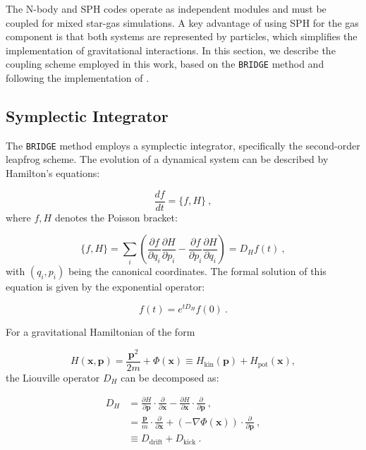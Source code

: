 The N-body and SPH codes operate as independent modules and must be coupled for mixed star-gas simulations. A key advantage of using SPH for the gas component is that both systems are represented by particles, which simplifies the implementation of gravitational interactions. In this section, we describe the coupling scheme employed in this work, based on the \texttt{BRIDGE} method \citep{fujii2007bridge} and following the implementation of \citet{reinoso2024formation}.

\subsection{Symplectic Integrator}
\label{subsec:3.4.1_Symplectic_integrator}

The \texttt{BRIDGE} method \citep{fujii2007bridge} employs a symplectic integrator, specifically the second-order leapfrog scheme. The evolution of a dynamical system can be described by Hamilton's equations:

\begin{equation}
	\frac{df}{dt} = \{f, H\}~,
\end{equation}
where ${f, H}$ denotes the Poisson bracket:

\begin{equation}
	\{f, H\} = \sum_{i} \left(\frac{\partial f}{\partial q_i} \frac{\partial H}{\partial p_i}  - \frac{\partial f}{\partial p_i} \frac{\partial H}{\partial q_i}\right) = D_H f(t)~,
\end{equation}
with $(q_i, p_i)$ being the canonical coordinates. The formal solution of this equation is given by the exponential operator:

\begin{equation}
	f(t) = e^{tD_H}f(0)~.
\end{equation}

For a gravitational Hamiltonian of the form

\begin{equation}
	H(\mathbf{x}, \mathbf{p}) = \frac{\mathbf{p}^2}{2m} + \Phi(\mathbf{x}) \equiv H_{\mathrm{kin}}(\mathbf{p}) + H_{\mathrm{pot}}(\mathbf{x}),
\end{equation}
the Liouville operator $D_H$ can be decomposed as:

\begin{align} 
	D_H &= \frac{\partial H}{\partial \mathbf{p}} \cdot \frac{\partial}{\partial \mathbf{x}} - \frac{\partial H}{\partial \mathbf{x}} \cdot \frac{\partial}{\partial \mathbf{p}} ~,\\ 
	&= \frac{\mathbf{p}}{m} \cdot \frac{\partial}{\partial \mathbf{x}} + (-\nabla \Phi(\mathbf{x})) \cdot \frac{\partial}{\partial \mathbf{p}} ~,\\ 
	&\equiv D_{\mathrm{drift}} + D_{\mathrm{kick}}~. 
\end{align}


